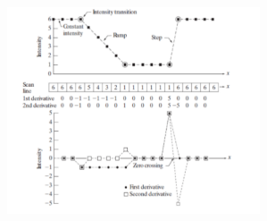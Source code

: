 \begin{figure}[H]
    \centering
    \includegraphics[width=\linewidth, keepaspectratio]{capitoli/immagini/imgs/sharpening2.png}
\end{figure}

